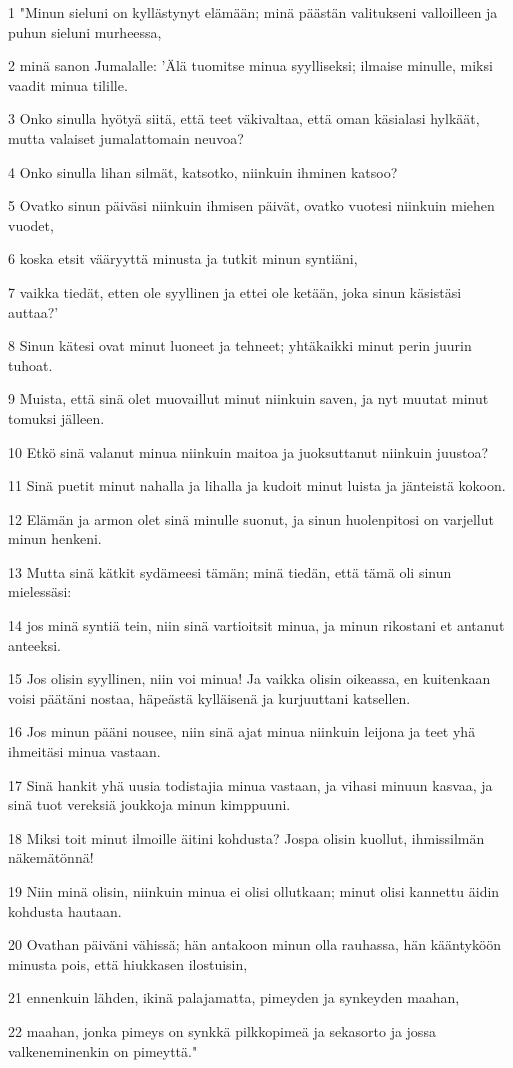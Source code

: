 \par 1 "Minun sieluni on kyllästynyt elämään; minä päästän valitukseni valloilleen ja puhun sieluni murheessa,
\par 2 minä sanon Jumalalle: 'Älä tuomitse minua syylliseksi; ilmaise minulle, miksi vaadit minua tilille.
\par 3 Onko sinulla hyötyä siitä, että teet väkivaltaa, että oman käsialasi hylkäät, mutta valaiset jumalattomain neuvoa?
\par 4 Onko sinulla lihan silmät, katsotko, niinkuin ihminen katsoo?
\par 5 Ovatko sinun päiväsi niinkuin ihmisen päivät, ovatko vuotesi niinkuin miehen vuodet,
\par 6 koska etsit vääryyttä minusta ja tutkit minun syntiäni,
\par 7 vaikka tiedät, etten ole syyllinen ja ettei ole ketään, joka sinun käsistäsi auttaa?'
\par 8 Sinun kätesi ovat minut luoneet ja tehneet; yhtäkaikki minut perin juurin tuhoat.
\par 9 Muista, että sinä olet muovaillut minut niinkuin saven, ja nyt muutat minut tomuksi jälleen.
\par 10 Etkö sinä valanut minua niinkuin maitoa ja juoksuttanut niinkuin juustoa?
\par 11 Sinä puetit minut nahalla ja lihalla ja kudoit minut luista ja jänteistä kokoon.
\par 12 Elämän ja armon olet sinä minulle suonut, ja sinun huolenpitosi on varjellut minun henkeni.
\par 13 Mutta sinä kätkit sydämeesi tämän; minä tiedän, että tämä oli sinun mielessäsi:
\par 14 jos minä syntiä tein, niin sinä vartioitsit minua, ja minun rikostani et antanut anteeksi.
\par 15 Jos olisin syyllinen, niin voi minua! Ja vaikka olisin oikeassa, en kuitenkaan voisi päätäni nostaa, häpeästä kylläisenä ja kurjuuttani katsellen.
\par 16 Jos minun pääni nousee, niin sinä ajat minua niinkuin leijona ja teet yhä ihmeitäsi minua vastaan.
\par 17 Sinä hankit yhä uusia todistajia minua vastaan, ja vihasi minuun kasvaa, ja sinä tuot vereksiä joukkoja minun kimppuuni.
\par 18 Miksi toit minut ilmoille äitini kohdusta? Jospa olisin kuollut, ihmissilmän näkemätönnä!
\par 19 Niin minä olisin, niinkuin minua ei olisi ollutkaan; minut olisi kannettu äidin kohdusta hautaan.
\par 20 Ovathan päiväni vähissä; hän antakoon minun olla rauhassa, hän kääntyköön minusta pois, että hiukkasen ilostuisin,
\par 21 ennenkuin lähden, ikinä palajamatta, pimeyden ja synkeyden maahan,
\par 22 maahan, jonka pimeys on synkkä pilkkopimeä ja sekasorto ja jossa valkeneminenkin on pimeyttä."

